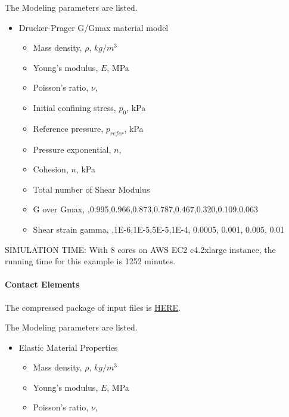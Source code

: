 The Modeling parameters are listed.
\begin{itemize}
  \item Drucker-Prager G/Gmax material model 
  \begin{itemize}
    \item Mass density, $\rho$, \enspace {} $kg/m^3$
    \item Young's modulus, $E$, \enspace {} MPa
    \item Poisson's ratio, $\nu$, \enspace {}
    \item Initial confining stress, $p_0$, \enspace {} kPa
    \item Reference pressure, $p_{refer} $, \enspace {} kPa
    \item Pressure exponential, $ n  $, \enspace {}
    \item Cohesion, $ n  $, \enspace {} kPa
    \item Total number of Shear Modulus \enspace {}
    \item G over Gmax, \enspace {},0.995,0.966,0.873,0.787,0.467,0.320,0.109,0.063
    \item Shear strain gamma, \enspace {},1E-6,1E-5,5E-5,1E-4, 0.0005, 0.001, 0.005, 0.01
  \end{itemize}
\end{itemize}

SIMULATION TIME: With 8 cores on AWS EC2 c4.2xlarge instance, the running time for this example is 1252 minutes.


\paragraph{Contact Elements}
The compressed package of input files is  
\href{https://github.com/yuan-energy/Real-ESSI-Short-Course-Examples/tree/master/short-course-examples/nonlinear_analysis_steps/soil-foundation/contact/contact.tgz?raw=true}{HERE}. 


The Modeling parameters are listed.
\begin{itemize}
  \item Elastic Material Properties 
  \begin{itemize}
    \item Mass density, $\rho$, \enspace {} $kg/m^3$
    \item Young's modulus, $E$, \enspace {} MPa
    \item Poisson's ratio, $\nu$, \enspace {}
  \end{itemize}
\end{itemize}

